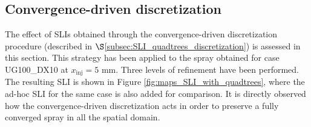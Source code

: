 \clearpage


\subsection{Convergence-driven discretization}


The effect of SLIs obtained through the convergence-driven discretization procedure (described in $\S$\ref{subsec:SLI_quadtrees_discretization}) is assessed in this section. This strategy has been applied to the spray obtained for case UG100\_DX10 at $x_\mathrm{inj} = 5$ mm. Three levels of refinement have been performed. The resulting SLI is shown in Figure \ref{fig:maps_SLI_with_quadtrees}, where the ad-hoc SLI for the same case is also added for comparison. It is directly observed how the convergence-driven discretization acts in order to preserve a fully converged spray in all the spatial domain.


